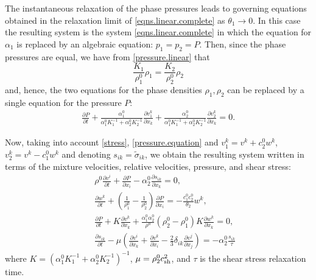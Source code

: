 \documentclass[3p,times,table]{article}
\newcommand{\csh}{c_{\rm sh}}
\begin{document}
The instantaneous relaxation of the phase pressures leads to governing 
equations obtained in the relaxation limit of \eqref{eqns.linear.complete} as 
$\theta_1 \rightarrow 0$.
In this case the resulting system is the system 
\eqref{eqns.linear.complete} in which the equation for $\alpha_1$ is replaced 
by an algebraic equation: $p_1=p_2=P$. Then, since the phase pressures are 
equal,  we have from \eqref {pressure.linear} that
$$\frac{K_1}{\rho^0_1} \rho_1=\frac{K_2}{\rho^0_2} \rho_2$$  
and, hence, the two equations for the phase densities $\rho_1,\rho_2$ can be 
replaced by 
a single equation for the pressure $P$:
\begin{align}\label{pressure.equation}
\frac{\partial P}{\partial t} +\frac{\alpha_1^0}{\alpha_1^0 K_1^{-1}+\alpha_2^0 K_2^{-1}}
\frac{\partial v_1^k}{\partial x_k}+
\frac{\alpha_2^0}{\alpha_1^0 K_1^{-1}+\alpha_2^0 K_2^{-1}}
\frac{\partial v_2^k}{\partial x_k} =0.
\end{align}

Now, taking into account \eqref{stress}, \eqref{pressure.equation} and $v_1^k=v^k+c_2^0w^k$, 
$v_2^k=v^k-c_1^0w^k$ and denoting $s_{ik}=\tilde \sigma_{ik}$, we obtain the resulting 
system written in terms of the mixture velocities, relative velocities, 
pressure, and shear stress:
\begin{subequations}\label{stress.velocity}
	\begin{eqnarray} 
&& \rho^0 \frac{\partial v^i}{\partial t}+\frac{\partial P}{\partial x_i}-
\alpha^0_2 \frac{\partial s_{ik}}{\partial x_k} = 0,  \\
&& \frac{\partial w^k}{\partial t}+ \left(\frac{1}{\rho_1^0} - 
\frac{1}{\rho_2^0}\right)\frac{\partial P}{\partial x_i}=
-\frac{c_1^0c_2^0}{\theta_2}w^k,  \label{stress.velocity.w}\\
&& \frac{\partial P}{\partial t} +K\frac{\partial v^k}{\partial x_k}+
\frac{\alpha_1^0\alpha_2^0}{\rho^0}\left(\rho^0_2-\rho^0_1 \right)
K\frac{\partial w^k}{\partial x_k} =0,   \\   \label{sij}
&&\frac{\partial s_{ik}}{\partial t} - 
\mu\left(\frac{\partial v^i}{\partial x_k} +\frac{\partial v^k}{\partial x_i}-
\frac{2}{3}\delta_{ik}\frac{\partial v^j}{\partial x_j} \right) = 
- \alpha_2^0 \frac{s_{ik}}{\tau}  
\end{eqnarray}
\end{subequations}
where $K=\left(\alpha_1^0 K_1^{-1}+\alpha_2^0 K_2^{-1}\right)^{-1}$, 
$\mu=\rho_2^0 \csh^2$, and $\tau $ %
is the shear stress relaxation time.
\end{document}
